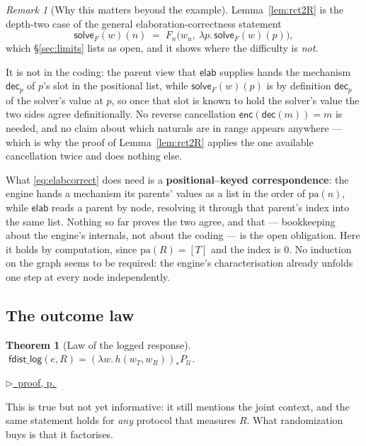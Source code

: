 \documentclass[11pt,a4paper]{article}
\theoremstyle{definition}
\theoremstyle{plain}
\newtheorem{theorem}[definition]{Theorem}
\theoremstyle{remark}
\newtheorem{remark}[definition]{Remark}
\newcommand{\pa}{\mathrm{pa}}
\newcommand{\Ctx}{\mathcal{U}}         %
\newcommand{\solve}{\mathsf{solve}}
\newcommand{\enc}{\mathsf{enc}}
\newcommand{\dect}{\mathsf{dec}}
\newcommand{\elab}{\mathsf{elab}}
\newcommand{\push}[1]{{#1}_{*}}        %
\newcommand{\pfref}[1]{%
  \par\smallskip\noindent
  \hyperref[pf:#1]{\small$\triangleright$\ proof, p.\,\pageref{pf:#1}}\par\smallskip}
\begin{document}
\begin{remark}[Why this matters beyond the example]
\label{rem:depth2}
Lemma~\ref{lem:rct2R} is the depth-two case of the general
elaboration-correctness statement
\begin{equation}
  \solve_F(w)(n) \;=\; F_n\bigl(w_n,\ \lambda p.\,\solve_F(w)(p)\bigr),
  \label{eq:elabcorrect}
\end{equation}
which \S\ref{sec:limits} lists as open, and it shows where the difficulty
is \emph{not}.

It is not in the coding: the parent view that $\elab$ supplies hands the
mechanism $\dect_p$ of $p$'s slot in the positional list, while
$\solve_F(w)(p)$ is by definition $\dect_p$ of the solver's value at $p$,
so once that slot is known to hold the solver's value the two sides agree
definitionally. No reverse cancellation $\enc(\dect(m)) = m$ is needed,
and no claim about which naturals are in range appears anywhere --- which
is why the proof of Lemma~\ref{lem:rct2R} applies the one available
cancellation twice and does nothing else.

What \eqref{eq:elabcorrect} does need is a \textbf{positional--keyed
correspondence}: the engine hands a mechanism its parents' values as a
list in the order of $\pa(n)$, while $\elab$ reads a parent by node,
resolving it through that parent's index into the same list. Nothing so
far proves the two agree, and that --- bookkeeping about the engine's
internals, not about the coding --- is the open obligation. Here it holds
by computation, since $\pa(R) = [T]$ and the index is $0$. No induction on
the graph seems to be required: the engine's characterisation already
unfolds one step at every node independently.
\end{remark}

\subsection{The outcome law}

\begin{theorem}[Law of the logged response]
\label{thm:rct2law}
$\;\mathsf{fdist\_log}(e, R) = \push{(\lambda w.\, h(w_T, w_R))} P_\Ctx$.
\end{theorem}

\pfref{thm:rct2law}

This is true but not yet informative: it still mentions the joint context,
and the same statement holds for \emph{any} protocol that measures $R$.
What randomization buys is that it factorises.
\end{document}

